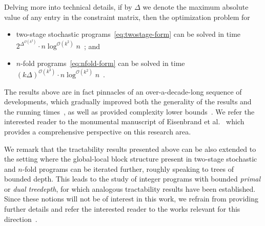 \documentclass{article}
\newcommand{\Oh}{{\mathcal{O}}}
\begin{document}
Delving more into technical details, if by $\Delta$ we denote the maximum absolute value of any entry in the constraint matrix, then the optimization problem for
\begin{itemize}[nosep]
    \item two-stage stochastic programs~\cref{eq:twostage-form} can be solved in time \mbox{$2^{\Delta^{\Oh(k^2)}}\cdot n\log^{\Oh(k^2)} n$}~\cite{CslovjecsekEPVW21}; and
    \item $n$-fold programs~\cref{eq:nfold-form} can be solved in time $(k\Delta)^{\Oh(k^3)}\cdot n\log^{\Oh(k^2)} n$~\cite{CslovjecsekEHRW21}.
\end{itemize}
The results above are in fact pinnacles of an over-a-decade-long sequence of developments, which gradually improved both the generality of the results and the running times~\cite{AschenbrennerH07,CslovjecsekEHRW21,CslovjecsekEPVW21,DeLoera2008,EisenbrandHK18,monster,HemmeckeOR13,JansenLR20,DBLP:journals/mp/Klein22,KouteckyLO18}, as well as provided complexity lower bounds~\cite{JansenKL23,KnopPW20}. We refer the interested reader to the monumental manuscript of Eisenbrand et al.~\cite{monster} which provides a comprehensive perspective on this research area.

We remark that the tractability results presented above can be also extended to the setting where the global-local block structure present in two-stage stochastic and $n$-fold programs can be iterated further, roughly speaking to trees of bounded depth. This leads to the study of integer programs with bounded {\em{primal}} or {\em{dual treedepth}}, for which analogous tractability results have been established. Since these notions will not be of interest in this work, we refrain from providing further details and refer the interested reader to the works relevant for this direction~\cite{BrianskiKKPS22,ChanCKKP22,ChenM18,CslovjecsekEHRW21,CslovjecsekEPVW21,EisenbrandHK18,monster,DBLP:journals/mp/Klein22,KleinR22,KnopPW20,KouteckyLO18}.
\end{document}
